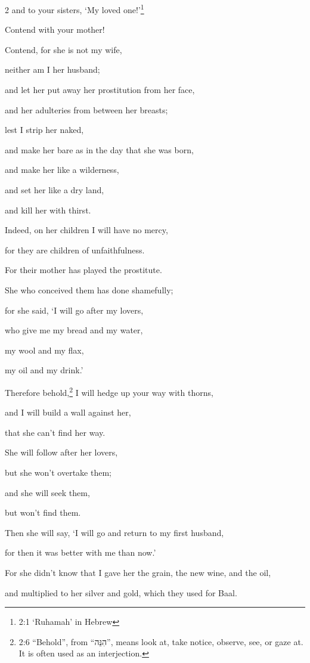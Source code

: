 \begin{multicols}{2}
and to your sisters, ‘My loved one!’\footnote{2:1 ‘Ruhamah’ in Hebrew}

\myverse{}Contend with your mother!

Contend, for she is not my wife,

neither am I her husband;

and let her put away her prostitution from her face,

and her adulteries from between her breasts;

\myverse{}lest I strip her naked,

and make her bare as in the day that she was born,

and make her like a wilderness,

and set her like a dry land,

and kill her with thirst.

\myverse{}Indeed, on her children I will have no mercy,

for they are children of unfaithfulness.

\myverse{}For their mother has played the prostitute.

She who conceived them has done shamefully;

for she said, ‘I will go after my lovers,

who give me my bread and my water,

my wool and my flax,

my oil and my drink.’

\myverse{}Therefore behold,\footnote{2:6 “Behold”, from “הִנֵּה”, means look at, take notice, observe, see, or gaze at. It is
	often used as an interjection.} I will hedge up your way with thorns,

and I will build a wall against her,

that she can’t find her way.

\myverse{}She will follow after her lovers,

but she won’t overtake them;

and she will seek them,

but won’t find them.

Then she will say, ‘I will go and return to my first husband,

for then it was better with me than now.’

\myverse{}For she didn’t know that I gave her the grain, the new wine, and
the oil,

and multiplied to her silver and gold, which they used for Baal.


\end{multicols}
